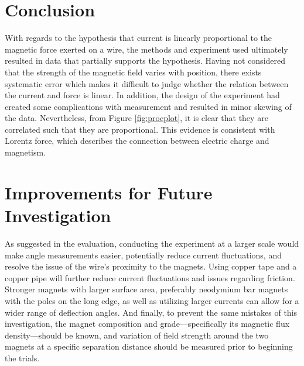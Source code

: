 \section*{Conclusion}

With regards to the hypothesis that current is linearly proportional to the magnetic force exerted on a wire, the methods and experiment used ultimately resulted in data that partially supports the hypothesis.
Having not considered that the strength of the magnetic field varies with position, there exists systematic error which makes it difficult to judge whether the relation between the current and force is linear.
In addition, the design of the experiment had created some complications with measurement and resulted in minor skewing of the data.
Nevertheless, from Figure \ref{fig:procplot}, it is clear that they are correlated such that they are proportional.
This evidence is consistent with Lorentz force, which describes the connection between electric charge and magnetism.

\section*{Improvements for Future Investigation}

As suggested in the evaluation, conducting the experiment at a larger scale would make angle measurements easier, potentially reduce current fluctuations, and resolve the issue of the wire's proximity to the magnets.
Using copper tape and a copper pipe will further reduce current fluctuations and issues regarding friction.
Stronger magnets with larger surface area, preferably neodymium bar magnets with the poles on the long edge, as well as utilizing larger currents can allow for a wider range of deflection angles.
And finally, to prevent the same mistakes of this investigation, the magnet composition and grade---specifically its magnetic flux density---should be known, and variation of field strength around the two magnets at a specific separation distance should be measured prior to beginning the trials.